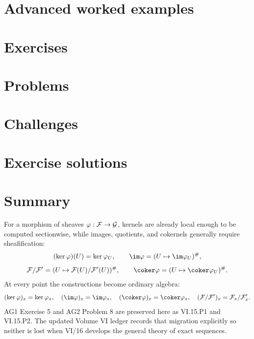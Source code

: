 \section{Advanced worked examples}


\section{Exercises}

\ifdefined\IncludeExerciseHints

\fi

\section{Problems}


\section{Challenges}


\ifdefined\IncludeExerciseSolutions
\section{Exercise solutions}

\fi

\section*{Summary}

For a morphism of sheaves $\varphi:\mathcal F\to\mathcal G$, kernels are already local enough to be
computed sectionwise, while images, quotients, and cokernels generally require
sheafification:
\[
(\ker\varphi)(U)=\ker\varphi_U,
\qquad
\im\varphi=(U\mapsto\im\varphi_U)^\#,
\]
\[
\F/\F'=(U\mapsto\F(U)/\F'(U))^\#,
\qquad
\coker\varphi=(U\mapsto\coker\varphi_U)^\#.
\]
At every point the constructions become ordinary algebra:
\[
(\ker\varphi)_x=\ker\varphi_x,
\quad
(\im\varphi)_x=\im\varphi_x,
\quad
(\coker\varphi)_x=\coker\varphi_x,
\quad
(\F/\F')_x=\F_x/\F'_x.
\]
AG1 Exercise 5 and AG2 Problem 8 are preserved here as VI.15.P1 and VI.15.P2.  The updated
Volume VI ledger records that migration explicitly so neither is lost when VI/16 develops
the general theory of exact sequences.

